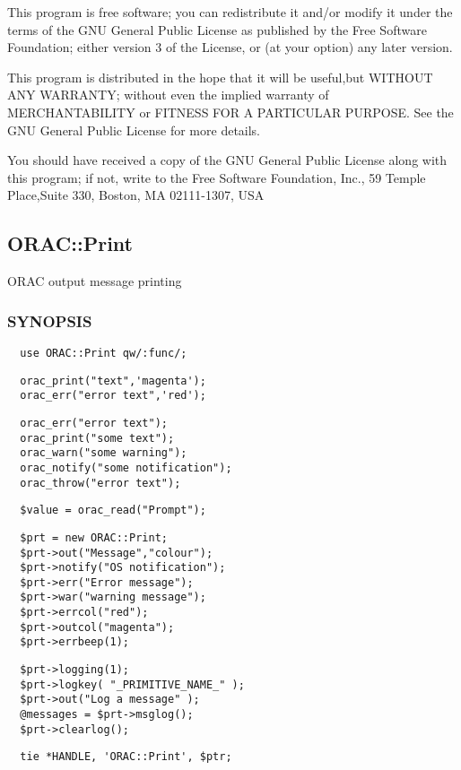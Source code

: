 This program is free software; you can redistribute it and/or modify it under
the terms of the GNU General Public License as published by the Free Software
Foundation; either version 3 of the License, or (at your option) any later
version.



This program is distributed in the hope that it will be useful,but WITHOUT ANY
WARRANTY; without even the implied warranty of MERCHANTABILITY or FITNESS FOR A
PARTICULAR PURPOSE. See the GNU General Public License for more details.



You should have received a copy of the GNU General Public License along with
this program; if not, write to the Free Software Foundation, Inc., 59 Temple
Place,Suite 330, Boston, MA  02111-1307, USA

\subsection{ORAC::Print\label{ORAC::Print}}


ORAC output message printing

\subsubsection*{SYNOPSIS\label{ORAC::Print_SYNOPSIS}}
\begin{verbatim}
  use ORAC::Print qw/:func/;
\end{verbatim}
\begin{verbatim}
  orac_print("text",'magenta');
  orac_err("error text",'red');
\end{verbatim}
\begin{verbatim}
  orac_err("error text");
  orac_print("some text");
  orac_warn("some warning");
  orac_notify("some notification");
  orac_throw("error text");
\end{verbatim}
\begin{verbatim}
  $value = orac_read("Prompt");
\end{verbatim}
\begin{verbatim}
  $prt = new ORAC::Print;
  $prt->out("Message","colour");
  $prt->notify("OS notification");
  $prt->err("Error message");
  $prt->war("warning message");
  $prt->errcol("red");
  $prt->outcol("magenta");
  $prt->errbeep(1);
\end{verbatim}
\begin{verbatim}
  $prt->logging(1);
  $prt->logkey( "_PRIMITIVE_NAME_" );
  $prt->out("Log a message" );
  @messages = $prt->msglog();
  $prt->clearlog();
\end{verbatim}
\begin{verbatim}
  tie *HANDLE, 'ORAC::Print', $ptr;
\end{verbatim}
